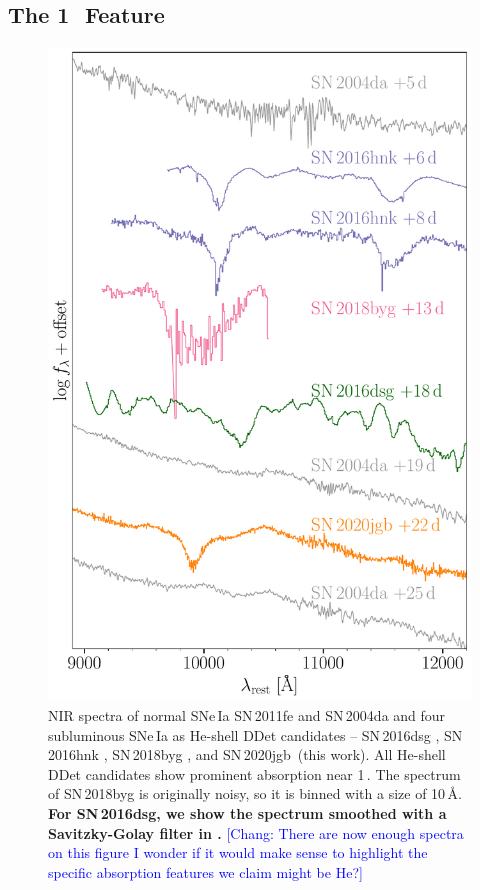 \documentclass[twocolumn]{aastex631}
\newcommand{\sn}{SN\,2020jgb}
\newcommand{\chang}[1]{\textcolor{blue}{[Chang: #1]}}
\newcommand{\revise}[1]{\textbf{#1}}
\begin{document}
\subsection{The 1\,\micron\ Feature} \label{sec:1um}
\begin{figure}
    \centering
    \includegraphics[width=\linewidth]{NIR_spec_comp.pdf}
    \caption{NIR spectra of normal SNe\,Ia SN\,2011fe \citep{Mazzali_2014} and SN\,2004da \citep{Marion2009_NIR} and four subluminous SNe\,Ia  as He-shell DDet candidates -- SN\,2016dsg \citep{Dong_16dsg_2022}, SN\,2016hnk \citep{galbany_16hnk_2019}, SN\,2018byg \citep{de_18byg_2019}, and \sn\ (this work). All He-shell DDet candidates show prominent absorption near 1\,\micron. The spectrum of SN\,2018byg is originally noisy, so it is binned with a size of 10\,\AA. \revise{For SN\,2016dsg, we show the spectrum smoothed with a Savitzky-Golay filter in \citet{Dong_16dsg_2022}.} \chang{There are now enough spectra on this figure I wonder if it would make sense to highlight the specific absorption features we claim might be He?}} 
    \label{fig:NIR_comp}
\end{figure}
\end{document}
